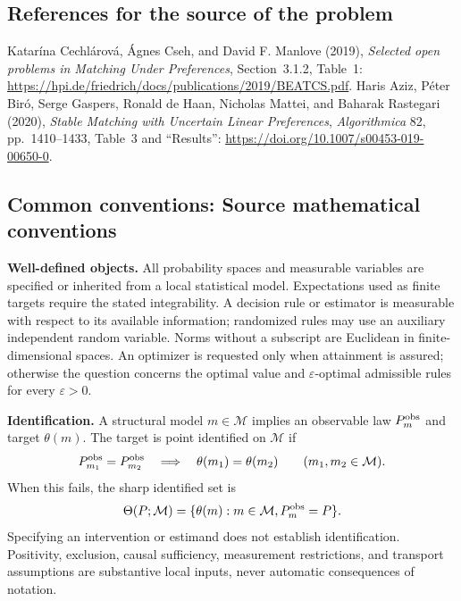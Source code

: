 \documentclass[11pt,a4paper]{article}
\begin{document}
\subsection*{References for the source of the problem}
Katar\'ina Cechl\'arov\'a, \'Agnes Cseh, and David F. Manlove (2019), \emph{Selected open problems in Matching Under Preferences}, Section~3.1.2, Table~1: \url{https://hpi.de/friedrich/docs/publications/2019/BEATCS.pdf}. Haris Aziz, P\'eter Bir\'o, Serge Gaspers, Ronald de Haan, Nicholas Mattei, and Baharak Rastegari (2020), \emph{Stable Matching with Uncertain Linear Preferences}, \emph{Algorithmica} 82, pp.~1410--1433, Table~3 and ``Results'': \url{https://doi.org/10.1007/s00453-019-00650-0}.

\subsection*{Common conventions: Source mathematical conventions}

\textbf{Well-defined objects.}
All probability spaces and measurable variables are specified or inherited
from a local statistical model. Expectations used as finite targets require
the stated integrability. A decision rule or estimator is measurable with
respect to its available information; randomized rules may use an auxiliary
independent random variable. Norms without a subscript are Euclidean in
finite-dimensional spaces. An optimizer is requested only when attainment
is assured; otherwise the question concerns the optimal value and
$\varepsilon$-optimal admissible rules for every $\varepsilon>0$.

\textbf{Identification.}
A structural model $m\in\mathcal M$ implies an observable law
$P_m^{\rm obs}$ and target $\theta(m)$. The target is point identified on
$\mathcal M$ if
\[
 P_{m_1}^{\rm obs}=P_{m_2}^{\rm obs}
 \quad\Longrightarrow\quad\theta(m_1)=\theta(m_2)
 \qquad(m_1,m_2\in\mathcal M).
\]
When this fails, the sharp identified set is
\[
 \Theta(P;\mathcal M)=\{\theta(m):m\in\mathcal M,
                                  P_m^{\rm obs}=P\}.
\]
Specifying an intervention or estimand does not establish identification.
Positivity, exclusion, causal sufficiency, measurement restrictions, and
transport assumptions are substantive local inputs, never automatic
consequences of notation.
\end{document}
